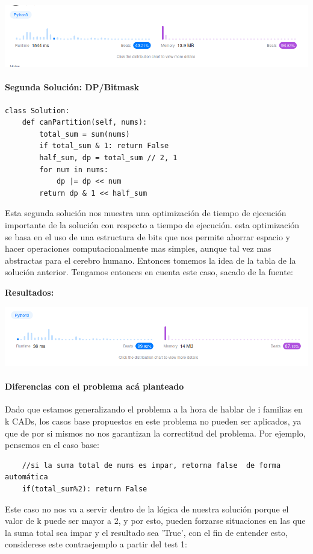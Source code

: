 \documentclass[a4paper]{article}
\begin{document}
\includegraphics[scale=0.7]{R1.png}

\paragraph{Segunda Solución: DP/Bitmask}
\begin{verbatim}
class Solution:
    def canPartition(self, nums):
        total_sum = sum(nums)
        if total_sum & 1: return False
        half_sum, dp = total_sum // 2, 1
        for num in nums:
            dp |= dp << num
        return dp & 1 << half_sum
\end{verbatim}

Esta segunda solución nos muestra una optimización de tiempo de ejecución importante
de la solución con respecto a tiempo de ejecución. esta optimización se basa en el uso
de una estructura de bits que nos permite ahorrar espacio y hacer operaciones computacionalmente
mas simples, aunque tal vez mas abstractas para el cerebro humano. Entonces tomemos
la idea de la tabla de la solución anterior. Tengamos entonces en cuenta este caso,
sacado de la fuente:

\textbf{Resultados:}

\includegraphics[scale=0.7]{R2.png}

\paragraph{Diferencias con el problema acá planteado}
Dado que estamos generalizando el problema a la hora de hablar de i familias en k CADs, los
casos base propuestos en este problema no pueden ser aplicados, ya que de por si mismos no 
nos garantizan la correctitud del problema. Por ejemplo, pensemos en el caso base:
\begin{verbatim}
    //si la suma total de nums es impar, retorna false  de forma automática
    if(total_sum%2): return False 
\end{verbatim}
Este caso no nos va a servir dentro de la lógica de nuestra solución porque el 
valor de k puede ser mayor a 2, y por esto, pueden forzarse situaciones en las que la suma total
sea impar y el resultado sea 'True', con el fin de entender esto, considerese este
contraejemplo a partir del test 1:
\end{document}

